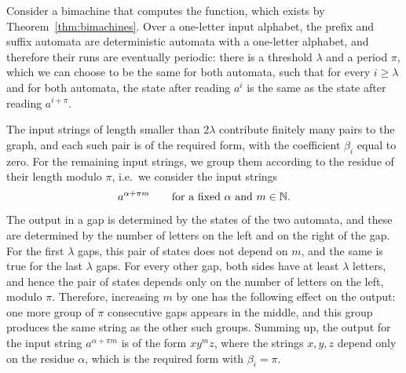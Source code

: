 {
    Consider a bimachine that computes the function, which exists by Theorem~\ref{thm:bimachines}. Over a one-letter input alphabet, the prefix and suffix automata are deterministic automata with a one-letter alphabet, and therefore their runs are eventually periodic: there is a threshold $\lambda$ and a period $\pi$, which we can choose to be the same for both automata, such that for every $i \geq \lambda$ and for both automata, the state after reading $a^i$ is the same as the state after reading $a^{i+\pi}$.

    The input strings of length smaller than $2\lambda$ contribute finitely many pairs to the graph, and each such pair is of the required form, with the coefficient $\beta_i$ equal to zero. For the remaining input strings, we group them according to the residue of their length modulo $\pi$, i.e.~we consider the input strings
    \begin{align*}
    a^{\alpha + \pi m} \qquad \text{for a fixed $\alpha$ and $m \in {\mathbb N}$}.
    \end{align*}
    The output in a gap is determined by the states of the two automata, and these are determined by the number of letters on the left and on the right of the gap. For the first $\lambda$ gaps, this pair of states does not depend on $m$, and the same is true for the last $\lambda$ gaps. For every other gap, both sides have at least $\lambda$ letters, and hence the pair of states depends only on the number of letters on the left, modulo $\pi$. Therefore, increasing $m$ by one has the following effect on the output: one more group of $\pi$ consecutive gaps appears in the middle, and this group produces the same string as the other such groups. Summing up, the output for the input string $a^{\alpha+\pi m}$ is of the form $x y^m z$, where the strings $x,y,z$ depend only on the residue $\alpha$, which is the required form with $\beta_i = \pi$.
}

